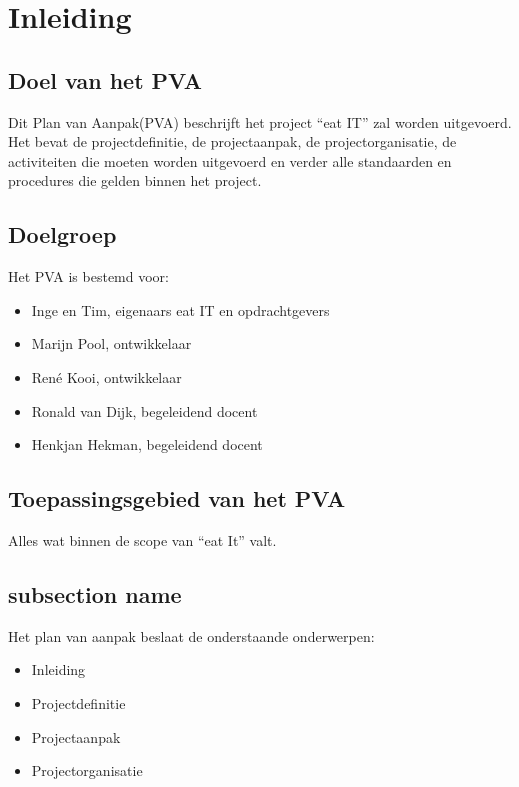 \documentclass{verslag}
\begin{document}
\titelpagina
\inhoudsopgave


\section{Inleiding} %
\label{sec:inleiding}

    \subsection{Doel van het PVA} %
    \label{sub:doel_van_het_pva}
    Dit Plan van Aanpak(PVA) beschrijft het project ``eat IT'' zal worden uitgevoerd. Het bevat de projectdefinitie, de projectaanpak, de projectorganisatie, de activiteiten die moeten worden uitgevoerd en verder alle standaarden en procedures die gelden binnen het project.

    \subsection{Doelgroep} %
    \label{sub:doelgroep}
    Het PVA is bestemd voor:
    \begin{itemize}
        \item Inge en Tim, eigenaars eat IT en opdrachtgevers
        \item Marijn Pool, ontwikkelaar
        \item René Kooi, ontwikkelaar
        \item Ronald van Dijk, begeleidend docent
        \item Henkjan Hekman, begeleidend docent
    \end{itemize}

    \subsection{Toepassingsgebied van het PVA} %
    \label{sub:toepassingsgebied_van_het_pva}
    Alles wat binnen de scope van ``eat It'' valt.

    \subsection{subsection name} %
    \label{sub:subsection_name}
    Het plan van aanpak beslaat de onderstaande onderwerpen:
    \begin{itemize}
        \item Inleiding
        \item Projectdefinitie
        \item Projectaanpak
        \item Projectorganisatie
    \end{itemize}
\end{document}

